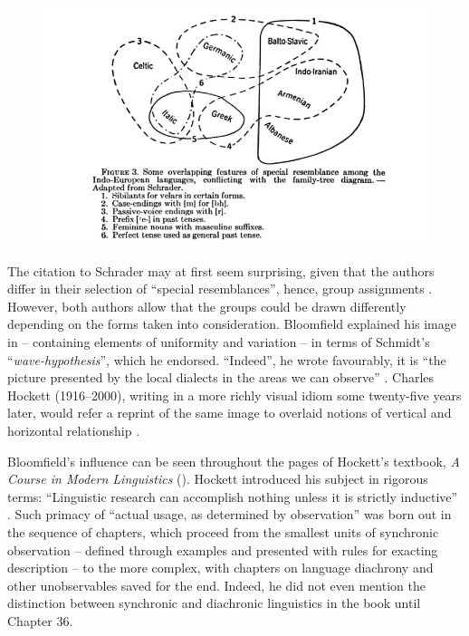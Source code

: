 \documentclass[output=paper]{langscibook}
\begin{document}
\begin{figure}
    \centering
    \includegraphics[width=\textwidth]{figures/bloomfield1933-316.png}
    \caption{\citet[316]{Bloomfield1933}}
    \label{fig:kaplan:bloomfield316}
\end{figure}

The citation to Schrader may at first seem surprising, given that the authors differ in their selection of ``special resemblances'', hence, group assignments \citep[317]{Bloomfield1933}. However, both authors allow that the groups could be drawn differently depending on the forms taken into consideration. Bloomfield explained his image in  -- containing elements of uniformity and variation -- in terms of Schmidt's ``\emph{wave-hypothesis}'', which he endorsed. ``Indeed'', he wrote favourably, it is ``the picture presented by the local dialects in the areas we can observe'' \citep[317]{Bloomfield1933}. Charles Hockett (1916--2000), writing in a more richly visual idiom some twenty-five years later, would refer a reprint of the same image to overlaid notions of vertical and horizontal relationship \citep[cf.][]{Huebschmann1875}.

Bloomfield's influence can be seen throughout the pages of Hockett's textbook, \emph{A Course in Modern Linguistics} (\citeyear{Hockett19591958}). Hockett introduced his subject in rigorous terms: ``Linguistic research can accomplish nothing unless it is strictly inductive'' \citep[7]{Hockett19591958}. Such primacy of ``actual usage, as determined by observation'' was born out in the sequence of chapters, which proceed from the smallest units of synchronic observation -- defined through examples and presented with rules for exacting description -- to the more complex, with chapters on language diachrony and other unobservables saved for the end. Indeed, he did not even mention the distinction between synchronic and diachronic linguistics in the book until Chapter 36.
\end{document}
